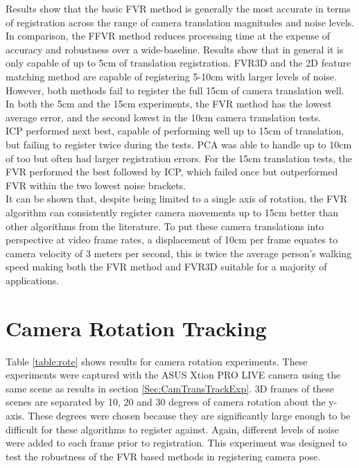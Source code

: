 Results show that the basic FVR method is generally the most accurate in terms of registration across the range of camera translation magnitudes and noise levels. In comparison, the FFVR method reduces processing time at the expense of accuracy and robustness over a wide-baseline. Results show that in general it is only capable of up to 5cm of translation registration. FVR3D and the 2D feature matching method are capable of registering 5-10cm with larger levels of noise. However, both methods fail to register the full 15cm of camera translation well. In both the 5cm and the 15cm experiments, the FVR method has the lowest average error, and the second lowest in the 10cm camera translation tests. \\

ICP performed next best, capable of performing well up to 15cm of translation, but failing to register twice during the tests. PCA was able to handle up to 10cm of too but often had larger registration errors. For the 15cm translation tests, the FVR performed the best followed by ICP, which failed once but outperformed FVR within the two lowest noise brackets. \\


It can be shown that, despite being limited to a single axis of rotation, the FVR algorithm can consistently register camera movements up to 15cm better than other algorithms from the literature. To put these camera translations into perspective at video frame rates, a displacement of 10cm per frame equates to camera velocity of 3 meters per second, this is twice the average person's walking speed making both the FVR method and FVR3D suitable for a majority of applications. \\


\section{Camera Rotation Tracking}
\label{Sec:CamRoteTrackExp}

Table \ref{table:rote} shows results for camera rotation experiments. These experiments were captured with the ASUS Xtion PRO LIVE camera using the same scene as results in section \ref{Sec:CamTransTrackExp}. 3D frames of these scenes are separated by 10, 20 and 30 degrees of camera rotation about the y-axis. These degrees were chosen because they are significantly large enough to be difficult for these algorithms to register against. Again, different levels of noise were added to each frame prior to registration. This experiment was designed to test the robustness of the FVR based methods in registering camera pose. \\


